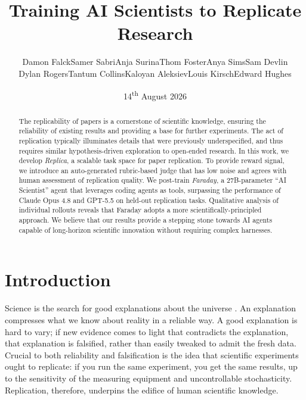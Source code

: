 \documentclass[garamond,a4paper]{inherent}
\title{Training AI Scientists to Replicate Research}
\author{Damon Falck\eqfirstmark\authormark{,1}\authorsep Samer Sabri\eqfirstmark\authormark{,1}\authorsep Anja Surina\authormark{1}\authorsep Thom Foster\authormark{1}\authorsep Anya Sims\authormark{1}\authorsep Sam Devlin\authormark{1}\authorsep \\ Dylan Rogers\authormark{1}\authorsep Tantum Collins\authormark{1}\authorsep Kaloyan Aleksiev\infmark\authormark{,1}\authorsep Louis Kirsch\eqlastmark\authormark{,1}\authorsep Edward Hughes\eqlastmark\authormark{,1}}
\date{14\textsuperscript{th} August 2026}
\newcommand{\faradayname}{Faraday\xspace}
\newcommand{\replicaname}{Replica\xspace}
\begin{document}
\maketitle

\begin{abstract}
The replicability of papers is a cornerstone of scientific knowledge, ensuring the reliability of existing results and providing a base for further experiments.
The act of replication typically illuminates details that were previously underspecified, and thus requires similar hypothesis-driven exploration to open-ended research.
In this work, we develop \textit{\replicaname}, a scalable task space for paper replication. 
To provide reward signal, we introduce an auto-generated rubric-based judge that has low noise and agrees with human assessment of replication quality.
We post-train \textit{\faradayname}, a 27B-parameter ``AI Scientist'' agent that leverages coding agents as tools, surpassing the performance of Claude Opus 4.8 and GPT-5.5 on held-out replication tasks.
Qualitative analysis of individual rollouts reveals that \faradayname adopts a more scientifically-principled approach.
We believe that our results provide a stepping stone towards AI agents capable of long-horizon scientific innovation without requiring complex harnesses.
\end{abstract}

\FloatBarrier
\section{Introduction}

\label{sec:introduction}

Science is the search for good explanations about the universe \citep{deutsch2011beginning}. An explanation compresses what we know about reality in a reliable way. 
A good explanation is hard to vary; if new evidence comes to light that contradicts the explanation, that explanation is falsified, rather than easily tweaked to admit the fresh data. Crucial to both reliability and falsification is the idea that scientific experiments ought to replicate: if you run the same experiment, you get the same results, up to the sensitivity of the measuring equipment and uncontrollable stochasticity. Replication, therefore, underpins the edifice of human scientific knowledge.
\end{document}
